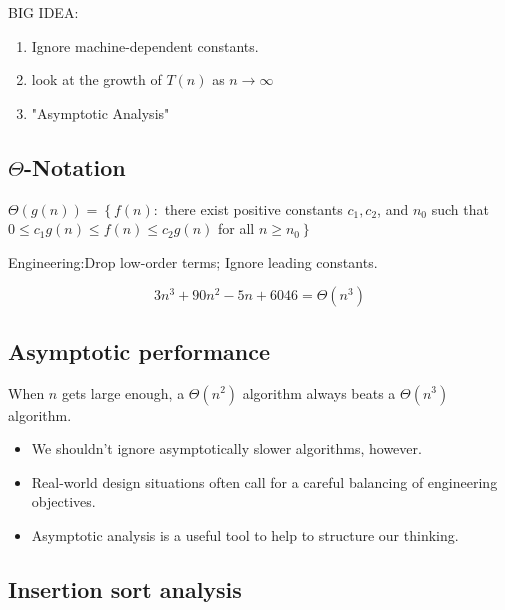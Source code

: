 \documentclass[11pt,toc=twocol]{elegantbook}
\begin{document}
\begin{note}
  BIG IDEA:
\end{note}
\begin{enumerate}
  \item Ignore machine-dependent constants.
  \item look at the growth of $T(n)$ as $n\to \infty$
  \item "Asymptotic Analysis"
\end{enumerate}
\subsection{$\Theta$-Notation}
\begin{definition}
  $\Theta(g(n))=\left\{f(n):\right.$ there exist positive constants $c_{1}, c_{2}$, and $n_{0}$ such that $0 \leq c_{1} g(n) \leq f(n) \leq c_{2} g(n)$ for all $\left.n \geq n_{0}\right\}$
\end{definition}
\begin{note}
  Engineering:Drop low-order terms; Ignore leading constants.
\end{note}
\begin{example}
  $$
3 n^{3}+90 n^{2}-5 n+6046=\Theta\left(n^{3}\right)
$$
\end{example}
\subsection{Asymptotic performance}
\begin{note}
  When $n$ gets large enough, a $\Theta\left(n^{2}\right)$ algorithm always beats a $\Theta\left(n^{3}\right)$ algorithm.
\end{note}


\begin{note}
  \begin{itemize}
    \item We shouldn't ignore asymptotically slower algorithms, however.
    \item Real-world design situations often call for a careful balancing of engineering objectives. 
    \item Asymptotic analysis is a useful tool to help to structure our thinking.
  \end{itemize}
\end{note}
\subsection{Insertion sort analysis}
\end{document}
